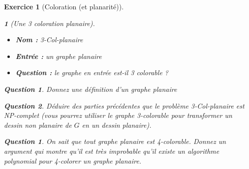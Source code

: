 \documentclass{article}
\theoremstyle{exostyle}
\newtheorem{exo}{Exercice}
\theoremstyle{partiestyle}
\newtheorem{partie}{}[exo]
\theoremstyle{questionstyle}
\newtheorem{question}{Question}[exo]
\newtheorem{questionpartie}{Question}[partie]
\begin{document}
\begin{exo}[Coloration (et planarité)]
\begin{partie}[Une 3 coloration planaire]
	\begin{itemize}
		\item {\bf Nom :} 3-Col-planaire
		\item {\bf Entrée :} un graphe planaire
		\item {\bf Question :} le graphe en entrée est-il 3 colorable ?
	\end{itemize}
		\begin{questionpartie}
			Donnez une définition d'un graphe planaire
		\end{questionpartie}
		\begin{questionpartie}
			Déduire des parties précédentes que le problème 3-Col-planaire est NP-complet (vous pourrez utiliser le graphe 3-colorable pour transformer un dessin non planaire de $G$ en un dessin planaire).
		\end{questionpartie}
		\end{partie}
		\addtocounter{question}{3}
		\begin{question}
			On sait que tout graphe planaire est 4-colorable. Donnez un argument qui montre qu'il est très improbable qu'il existe un algorithme polynomial pour 4-colorer un graphe planaire.
		\end{question}

	
\end{exo}
\end{document}
